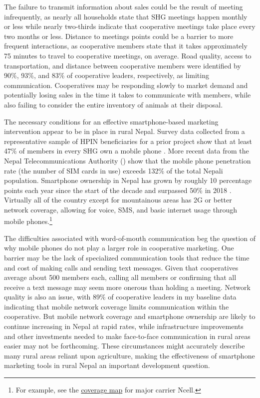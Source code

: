 \documentclass[11pt]{article}
\begin{document}
The failure to transmit information about sales could be the result of meeting infrequently, as nearly all households state that SHG meetings happen monthly or less while nearly two-thirds indicate that cooperative meetings take place every two months or less. Distance to meetings points could be a barrier to more frequent interactions, as cooperative members state that it takes approximately 75 minutes to travel to cooperative meetings, on average. Road quality, access to transportation, and distance between cooperative members were identified by 90\%, 93\%, and 83\% of cooperative leaders, respectively, as limiting communication. Cooperatives may be responding slowly to market demand and potentially losing sales in the time it takes to communicate with members, while also failing to consider the entire inventory of animals at their disposal. %

The necessary conditions for an effective smartphone-based marketing intervention appear to be in place in rural Nepal. Survey data collected from a representative sample of HPIN beneficiaries for a prior project show that at least 47\% of members in every SHG own a mobile phone \citep{janzen16-1}. %
More recent data from the Nepal Telecommunications Authority (\citeyear{NTA19}) show that the mobile phone penetration rate (the number of SIM cards in use) exceeds 132\% of the total Nepali population. Smartphone ownership in Nepal has grown by roughly 10 percentage points each year since the start of the decade and surpassed 50\% in 2018 \citep{nepalitelecom18}. Virtually all of the country except for mountainous areas has 2G or better network coverage, allowing for voice, SMS, and basic internet usage through mobile phones.\footnote{For example, see the \href{https://www.ncell.axiata.com/About-Us/Coverage}{coverage map} for major carrier Ncell.} 

The difficulties associated with word-of-mouth communication beg the question of why mobile phones do not play a larger role in cooperative marketing. One barrier may be the lack of specialized communication tools that reduce the time and cost of making calls and sending text messages. Given that cooperatives average about 500 members each, calling all members or confirming that all receive a text message may seem more onerous than holding a meeting. Network quality is also an issue, with 89\% of cooperative leaders in my baseline data indicating that mobile network coverage limits communication within the cooperative. But mobile network coverage and smartphone ownership are likely to continue increasing in Nepal at rapid rates, while infrastructure improvements and other investments needed to make face-to-face communication in rural areas easier may not be forthcoming. These circumstances might accurately describe many rural areas reliant upon agriculture, making the effectiveness of smartphone marketing tools in rural Nepal an important development question.
\end{document}
